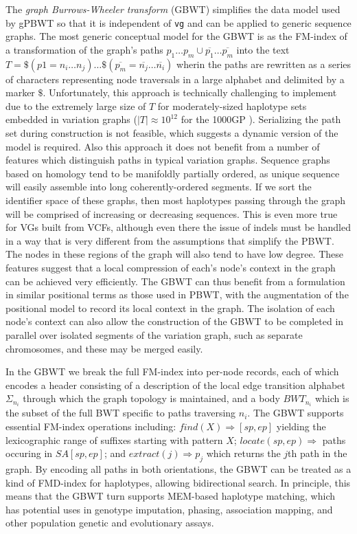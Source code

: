 The \emph{graph Burrows-Wheeler transform} (GBWT) \cite{siren2018haplotype} simplifies the data model used by gPBWT so that it is independent of {\tt vg} and can be applied to generic sequence graphs.
The most generic conceptual model for the GBWT is as the FM-index of a transformation of the graph's paths $p_1\ldots p_m \cup \overline{p_1}\ldots \overline{p_m}$ into the text $T = \$( p1 = n_i\ldots n_j) \ldots \$ (\overline{p_m} = \overline{n_j} \ldots \overline{n_i}) $ wherin the paths are rewritten as a series of characters representing node traversals in a large alphabet and delimited by a marker $\$$.
Unfortunately, this approach is technically challenging to implement due to the extremely large size of $T$ for moderately-sized haplotype sets embedded in variation graphs ($|T| \approx 10^{12}$ for the 1000GP  \cite{siren2018haplotype}).
Serializing the path set during construction is not feasible, which suggests a dynamic version of the model is required.
Also this approach it does not benefit from a number of features which distinguish paths in typical variation graphs.
Sequence graphs based on homology tend to be manifoldly partially ordered, as unique sequence will easily assemble into long coherently-ordered segments.
If we sort the identifier space of these graphs, then most haplotypes passing through the graph will be comprised of increasing or decreasing sequences.
This is even more true for VGs built from VCFs, although even there the issue of indels must be handled in a way that is very different from the assumptions that simplify the PBWT.
The nodes in these regions of the graph will also tend to have low degree.
These features suggest that a local compression of each's node's context in the graph can be achieved very efficiently.
The GBWT can thus benefit from a formulation in similar positional terms as those used in PBWT, with the augmentation of the positional model to record its local context in the graph.
The isolation of each node's context can also allow the construction of the GBWT to be completed in parallel over isolated segments of the variation graph, such as separate chromosomes, and these may be merged easily.

In the GBWT we break the full FM-index into per-node records, each of which encodes a header consisting of a description of the local edge transition alphabet $\Sigma_{n_i}$ through which the graph topology is maintained, and a body $BWT_{n_i}$ which is the subset of the full BWT specific to paths traversing $n_i$.
The GBWT supports essential FM-index operations including: $find(X) \Rightarrow [sp, ep]$ yielding the lexicographic range of suffixes starting with pattern $X$; $locate(sp, ep) \Rightarrow$ paths occuring in $SA[sp, ep]$; and $extract(j) \Rightarrow p_j$ which returns the $j$th path in the graph.
By encoding all paths in both orientations, the GBWT can be treated as a kind of FMD-index for haplotypes, allowing bidirectional search.
In principle, this means that the GBWT turn supports MEM-based haplotype matching, which has potential uses in genotype imputation, phasing, association mapping, and other population genetic and evolutionary assays.

